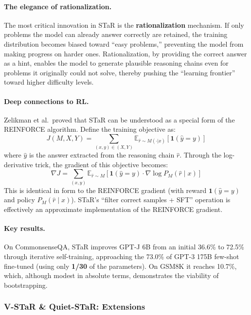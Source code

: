 \paragraph{The elegance of rationalization.}
The most critical innovation in STaR is the \textbf{rationalization} mechanism.
If only problems the model can already answer correctly are retained,
the training distribution becomes biased toward ``easy problems,'' preventing the model from making progress on harder ones.
Rationalization, by providing the correct answer as a hint,
enables the model to generate plausible reasoning chains even for problems it originally could not solve,
thereby pushing the ``learning frontier'' toward higher difficulty levels.

\paragraph{Deep connections to RL.}
Zelikman et al.\ proved that STaR can be understood as a special form of the REINFORCE algorithm.
Define the training objective as:
\begin{equation}
\label{eq:star-rl}
J(M, X, Y) = \sum_{(x,y) \in (X,Y)} \mathbb{E}_{\hat{r} \sim M(\cdot|x)}
\left[ \mathbf{1}(\hat{y} = y) \right]
\end{equation}
where $\hat{y}$ is the answer extracted from the reasoning chain $\hat{r}$.
Through the log-derivative trick, the gradient of this objective becomes:
\begin{equation}
\label{eq:star-gradient}
\nabla J = \sum_{(x,y)} \mathbb{E}_{\hat{r} \sim M}
\left[ \mathbf{1}(\hat{y} = y) \cdot \nabla \log P_M(\hat{r} \mid x) \right]
\end{equation}
This is identical in form to the REINFORCE gradient
(with reward $\mathbf{1}(\hat{y} = y)$ and policy $P_M(\hat{r} \mid x)$).
STaR's ``filter correct samples + SFT'' operation is effectively an approximate implementation of the REINFORCE gradient.

\paragraph{Key results.}
On CommonsenseQA,
STaR improves GPT-J 6B from an initial 36.6\% to 72.5\% through iterative self-training,
approaching the 73.0\% of GPT-3 175B few-shot fine-tuned (using only \textbf{1/30} of the parameters).
On GSM8K it reaches 10.7\%, which, although modest in absolute terms, demonstrates the viability of bootstrapping.

\subsubsection{V-STaR \& Quiet-STaR: Extensions}

